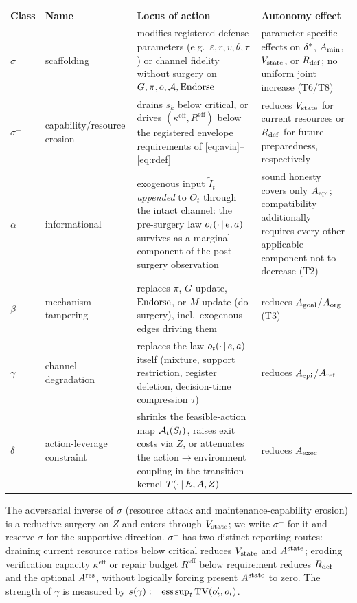 \begin{center}
\small
\begin{tabularx}{\textwidth}{@{}l l >{\raggedright\arraybackslash}X
>{\raggedright\arraybackslash}X@{}}
\toprule
Class & Name & Locus of action & Autonomy effect \\
\midrule
$\sigma$ & scaffolding & modifies registered defense parameters (e.g.\
$\varepsilon,r,v,\theta,\tau$) or channel fidelity without surgery on
$G,\pi,o,\mathcal{A},\mathrm{Endorse}$ & parameter-specific effects on $\delta^{*}$,
$A_{\min}$, $V_{\mathrm{state}}$, or $R_{\mathrm{def}}$; no uniform joint increase (T6/T8) \\
$\sigma^{-}$ & capability/resource erosion & drains $s_k$ below critical, or
drives $(\kappa^{\mathrm{eff}},R^{\mathrm{eff}})$ below the registered
envelope requirements of \eqref{eq:avia}--\eqref{eq:rdef} & reduces $V_{\mathrm{state}}$
for current resources or $R_{\mathrm{def}}$ for future preparedness, respectively \\
$\alpha$ & informational & exogenous input $\tilde{I}_t$ \emph{appended} to
$O_t$ through the intact channel: the pre-surgery law $o_t(\cdot\,|\, e,a)$
survives as a marginal component of the post-surgery observation & sound
honesty covers only $A_{\mathrm{epi}}$; compatibility additionally requires every other
applicable component not to decrease (T2) \\
$\beta$ & mechanism tampering & replaces $\pi$, $G$-update, $\mathrm{Endorse}$, or
$M$-update (do-surgery), incl.\ exogenous edges driving them & reduces
$A_{\mathrm{goal}}$/$A_{\mathrm{org}}$ (T3) \\
$\gamma$ & channel degradation & replaces the law $o_t(\cdot\,|\, e,a)$
itself (mixture, support restriction, register deletion, decision-time
compression $\tau$) & reduces $A_{\mathrm{epi}}$/$A_{\mathrm{ref}}$ \\
$\delta$ & action-leverage constraint & shrinks the feasible-action map
$\mathcal{A}_t(S_t)$, raises exit costs via $Z$, or attenuates the
action$\to$environment coupling in the transition kernel $T(\cdot\,|\,
E,A,Z)$ & reduces $A_{\mathrm{exec}}$ \\
\bottomrule
\end{tabularx}
\end{center}

\noindent The adversarial inverse of $\sigma$ (resource attack and
maintenance-capability erosion) is a reductive
surgery on $Z$ and enters through $V_{\mathrm{state}}$; we write $\sigma^{-}$ for it and
reserve $\sigma$ for the supportive direction. $\sigma^{-}$ has two distinct
reporting routes: draining current resource ratios below critical reduces
$V_{\mathrm{state}}$ and $A^{\mathrm{state}}$; eroding verification capacity $\kappa^{\mathrm{eff}}$ or
repair budget $R^{\mathrm{eff}}$ below requirement reduces $R_{\mathrm{def}}$ and the
optional $A^{\mathrm{res}}$, without logically forcing present $A^{\mathrm{state}}$ to zero. The
strength of $\gamma$ is
measured by $s(\gamma):=\mathrm{ess\,sup}_t\,\mathrm{TV}(o'_t,o_t)$.

